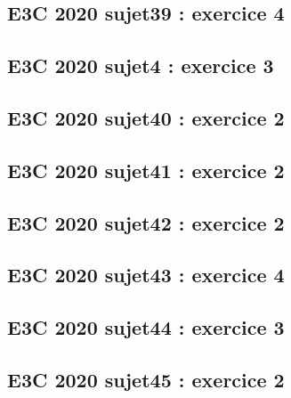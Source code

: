\documentclass[lang=fr,edition=teacher,layout=sheet]{mxbook}
\begin{document}
\par\bigskip
{}\subsection*{E3C 2020 sujet39 : exercice 4}
\begingroup\endgroup
\par\bigskip
{}\subsection*{E3C 2020 sujet4 : exercice 3}
\begingroup\endgroup
\par\bigskip
{}\subsection*{E3C 2020 sujet40 : exercice 2}
\begingroup\endgroup
\par\bigskip
{}\subsection*{E3C 2020 sujet41 : exercice 2}
\begingroup\endgroup
\par\bigskip
{}\subsection*{E3C 2020 sujet42 : exercice 2}
\begingroup\endgroup
\par\bigskip
{}\subsection*{E3C 2020 sujet43 : exercice 4}
\begingroup\endgroup
\par\bigskip
{}\subsection*{E3C 2020 sujet44 : exercice 3}
\begingroup\endgroup
\par\bigskip
{}\subsection*{E3C 2020 sujet45 : exercice 2}
\end{document}
